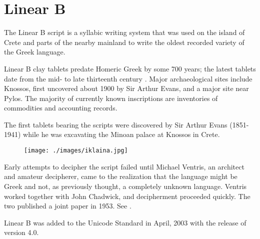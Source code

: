 \newfontfamily{}
\section{Linear B}
\label{s:linearb}
The Linear B script is a syllabic writing system that was used on the island of Crete and
parts of the nearby mainland to write the oldest recorded variety of the Greek language.

Linear B clay tablets predate Homeric Greek by some 700 years; the latest tablets date from
the mid- to late thirteenth century \bce. Major archaeological sites include Knossos, first
uncovered about 1900 by Sir Arthur Evans, and a major site near Pylos. The majority of
currently known inscriptions are inventories of commodities and accounting records.

The first tablets bearing the scripts were discovered by Sir Arthur Evans (1851-1941) while he was excavating the Minoan palace at Knossos in Crete. 


\medskip

\begin{figure}[ht]
\centering
\begin{minipage}{5cm}
\texttt{[image: ./images/iklaina.jpg]}
\end{minipage}\hspace{2em}
\begin{minipage}{7cm}
\end{minipage}

\end{figure}


Early attempts to decipher the script failed until Michael Ventris, an architect and amateur
decipherer, came to the realization that the language might be Greek and not, as previously
thought, a completely unknown language. Ventris worked together with John Chadwick,
and decipherment proceeded quickly. The two published a joint paper in 1953. See .




Linear B was added to the Unicode Standard in April, 2003 with the release of version 4.0.

